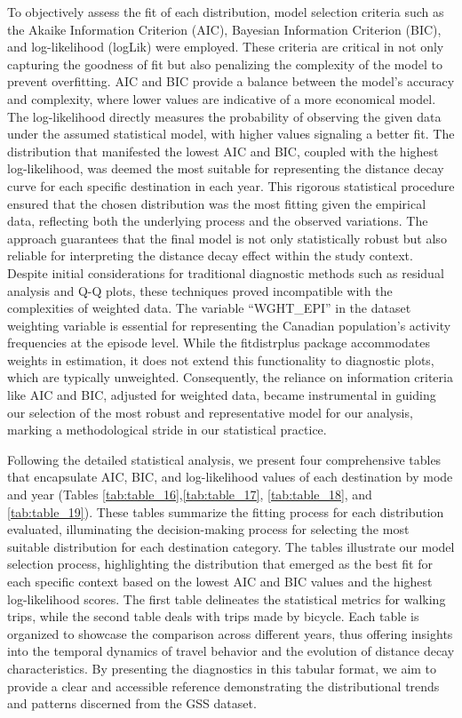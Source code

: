\documentclass[
11pt, %
oneside, %
english, %
singlespacing, %
]{macthesis} %
\begin{document}
To objectively assess the fit of each distribution, model selection criteria such as the Akaike Information Criterion (AIC), Bayesian Information Criterion (BIC), and log-likelihood (logLik) were employed. These criteria are critical in not only capturing the goodness of fit but also penalizing the complexity of the model to prevent overfitting. AIC and BIC provide a balance between the model's accuracy and complexity, where lower values are indicative of a more economical model. The log-likelihood directly measures the probability of observing the given data under the assumed statistical model, with higher values signaling a better fit. The distribution that manifested the lowest AIC and BIC, coupled with the highest log-likelihood, was deemed the most suitable for representing the distance decay curve for each specific destination in each year. This rigorous statistical procedure ensured that the chosen distribution was the most fitting given the empirical data, reflecting both the underlying process and the observed variations. The approach guarantees that the final model is not only statistically robust but also reliable for interpreting the distance decay effect within the study context. Despite initial considerations for traditional diagnostic methods such as residual analysis and Q-Q plots, these techniques proved incompatible with the complexities of weighted data. The variable ``WGHT\_EPI'' in the dataset weighting variable is essential for representing the Canadian population's activity frequencies at the episode level. While the fitdistrplus package accommodates weights in estimation, it does not extend this functionality to diagnostic plots, which are typically unweighted. Consequently, the reliance on information criteria like AIC and BIC, adjusted for weighted data, became instrumental in guiding our selection of the most robust and representative model for our analysis, marking a methodological stride in our statistical practice.

Following the detailed statistical analysis, we present four comprehensive tables that encapsulate AIC, BIC, and log-likelihood values of each destination by mode and year (Tables \ref{tab:table_16},\ref{tab:table_17}, \ref{tab:table_18}, and \ref{tab:table_19}). These tables summarize the fitting process for each distribution evaluated, illuminating the decision-making process for selecting the most suitable distribution for each destination category. The tables illustrate our model selection process, highlighting the distribution that emerged as the best fit for each specific context based on the lowest AIC and BIC values and the highest log-likelihood scores. The first table delineates the statistical metrics for walking trips, while the second table deals with trips made by bicycle. Each table is organized to showcase the comparison across different years, thus offering insights into the temporal dynamics of travel behavior and the evolution of distance decay characteristics. By presenting the diagnostics in this tabular format, we aim to provide a clear and accessible reference demonstrating the distributional trends and patterns discerned from the GSS dataset.
\end{document}
